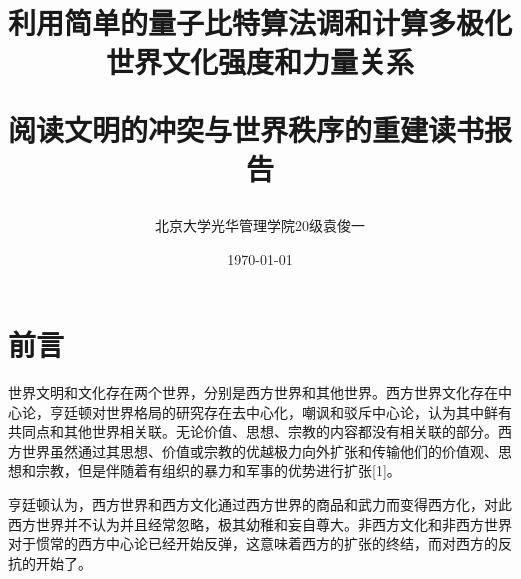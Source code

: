 \documentclass[11pt,twocolumn]{ctexart}
\begin{document}
\title{利用简单的量子比特算法调和计算多极化世界文化强度和力量关系\\
\begin{large}
阅读文明的冲突与世界秩序的重建读书报告
\end{large}}
\author{北京大学光华管理学院20级袁俊一}
\date{\today}

\twocolumn[
    \begin{@twocolumnfalse}		
    \maketitle %



   \begin{flushleft}
   \noindent        %
   \hangafter=0     %
   \setlength{\hangindent}{2em} %

   {{\textbf{摘要:} 量子计算机硬件的关键在于量子门操作。两个量子比特门是实现量子信息处理器的主要途径。在这里，我们提出了一个两量子比特门构成的可调耦合器，通过调制耦合器的频率来控制量子比特和量子比特的耦合。两个量子比特门的操作可以通过在色散区操作耦合器来实现，这对量子比特的状态是无影响的。我们模拟了一个通用的两量子比特耦合机制来研究该方案，最后得出了理想的效果。}}

   {{\textbf{关键词:} 相交理论；层论；Hodge理论；代数几何方法；代数流形方法；多极化世界；文化簇；文化极；社会关系；基本价值}}
   \vspace{0.2in}

   \end{flushleft}

    \end{@twocolumnfalse}
]




\section{前言}
世界文明和文化存在两个世界，分别是西方世界和其他世界。西方世界文化存在中心论，亨廷顿对世界格局的研究存在去中心化，嘲讽和驳斥中心论，认为其中鲜有共同点和其他世界相关联。无论价值、思想、宗教的内容都没有相关联的部分。西方世界虽然通过其思想、价值或宗教的优越极力向外扩张和传输他们的价值观、思想和宗教，但是伴随着有组织的暴力和军事的优势进行扩张[1]。

亨廷顿认为，西方世界和西方文化通过西方世界的商品和武力而变得西方化，对此西方世界并不认为并且经常忽略，极其幼稚和妄自尊大。非西方文化和非西方世界对于惯常的西方中心论已经开始反弹，这意味着西方的扩张的终结，而对西方的反抗的开始了。
\end{document}
